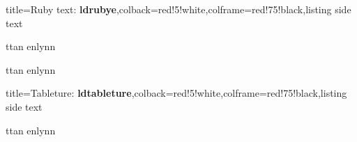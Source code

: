 \documentclass{article}
\begin{document}
\bigskip
\begin{tcblisting}{title={{\sffamily Ruby text: \bfseries\textcolor{blue!10}{ldrubye}}},colback=red!5!white,colframe=red!75!black,listing side text}
\begin{ldrubye}
ttan enlynn

ttan enlynn
\end{ldrubye}
\end{tcblisting}

\bigskip
\begin{tcblisting}{title={{\sffamily Tableture: \bfseries\textcolor{blue!10}{ldtableture}}},colback=red!5!white,colframe=red!75!black,listing side text}
\begin{ldtableture}
ttan enlynn
\end{ldtableture}
\end{tcblisting}


\ldlists

\ldshowconspectus
\end{document}
